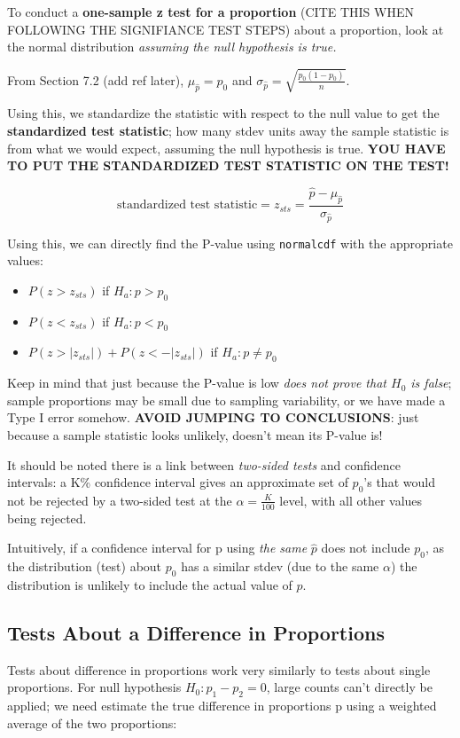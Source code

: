 \documentclass[12pt, a4paper]{article}
\theoremstyle{definition}
\begin{document}
To conduct a \textbf{one-sample z test for a proportion} (CITE THIS WHEN FOLLOWING THE SIGNIFIANCE TEST STEPS) about a proportion, look at the normal distribution \textit{assuming the null hypothesis is true.}

From Section 7.2 (add ref later), $\mu_{\hat{p}} = p_0$ and $\sigma_{\hat{p}} = \sqrt{\frac{p_0(1-p_0)}{n}}$.

Using this, we standardize the statistic with respect to the null value to get the \textbf{standardized test statistic}; how many stdev units away the sample statistic is from what we would expect, assuming the null hypothesis is true.
\textbf{YOU HAVE TO PUT THE STANDARDIZED TEST STATISTIC ON THE TEST!}

\[\textrm{standardized test statistic} = z_{sts} = \frac{\hat{p} - \mu_{\hat{p}}}{\sigma_{\hat{p}}}\]

Using this, we can directly find the P-value using \verb|normalcdf| with the appropriate values:
\begin{itemize}
    \item $P(z > z_{sts})$ if $H_a : p > p_0$
    \item $P(z < z_{sts})$ if $H_a : p < p_0$
    \item $P(z > |z_{sts}|) + P(z < -|z_{sts}|)$ if $H_a : p \neq p_0$
\end{itemize}

Keep in mind that just because the P-value is low \textit{does not prove that $H_0$ is false}; sample proportions may be small due to sampling variability, or we have made a Type I error somehow. \textbf{AVOID JUMPING TO CONCLUSIONS}: just because a sample statistic looks unlikely, doesn't mean its P-value is!

It should be noted there is a link between \textit{two-sided tests} and confidence intervals: a K\% confidence interval gives an approximate set of $p_0$'s that would not be rejected by a two-sided test at the $\alpha = \frac{K}{100}$ level, with all other values being rejected.

Intuitively, if a confidence interval for p using \textit{the same} $\hat{p}$ does not include $p_0$, as the distribution (test) about $p_0$ has a similar stdev (due to the same $\alpha$) the distribution is unlikely to include the actual value of $p$.

\subsection{Tests About a Difference in Proportions}
Tests about difference in proportions work very similarly to tests about single proportions. For null hypothesis $H_0 : p_1 - p_2 = 0$, large counts can't directly be applied; we need estimate the true difference in proportions p using a weighted average of the two proportions:
\end{document}

